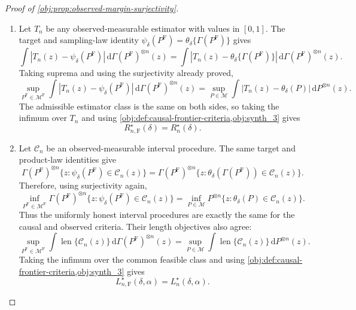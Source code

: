 \begin{proof}[Proof of \cref{obj:prop:observed-margin-surjectivity}]
\begin{enumerate}
\item Let \(T_n\) be any observed-measurable estimator with values in \([0,1]\).  The target and sampling-law identity \(\psi_\delta(P^{\mathrm F})=\theta_\delta\{\Gamma(P^{\mathrm F})\}\) gives
\[
\int
\left|T_n(z)-\psi_\delta(P^{\mathrm F})\right|\,\mathrm d\Gamma(P^{\mathrm F})^{\otimes n}(z)
=
\int
\left|T_n(z)-\theta_\delta\{\Gamma(P^{\mathrm F})\}\right|\,\mathrm d\Gamma(P^{\mathrm F})^{\otimes n}(z).
\]
Taking suprema and using the surjectivity already proved,
\[
\sup_{P^{\mathrm F}\in\mathcal M^{\mathrm F}}
\int
\left|T_n(z)-\psi_\delta(P^{\mathrm F})\right|\,\mathrm d\Gamma(P^{\mathrm F})^{\otimes n}(z)
=
\sup_{P\in\mathcal M}
\int
\left|T_n(z)-\theta_\delta(P)\right|\,\mathrm dP^{\otimes n}(z).
\]
The admissible estimator class is the same on both sides, so taking the infimum over \(T_n\) and using \cref{obj:def:causal-frontier-criteria,obj:synth_3} gives
\[
R_{n,\mathrm F}^{\star}(\delta)=R_n^\star(\delta).
\] %

\item Let \(\mathcal C_n\) be an observed-measurable interval procedure.  The same target and product-law identities give
\[
\Gamma(P^{\mathrm F})^{\otimes n}
\{z:\psi_\delta(P^{\mathrm F})\in\mathcal C_n(z)\}
=
\Gamma(P^{\mathrm F})^{\otimes n}
\{z:\theta_\delta(\Gamma(P^{\mathrm F}))\in\mathcal C_n(z)\}.
\]
Therefore, using surjectivity again,
\[
\inf_{P^{\mathrm F}\in\mathcal M^{\mathrm F}}
\Gamma(P^{\mathrm F})^{\otimes n}
\{z:\psi_\delta(P^{\mathrm F})\in\mathcal C_n(z)\}
=
\inf_{P\in\mathcal M}
P^{\otimes n}\{z:\theta_\delta(P)\in\mathcal C_n(z)\}.
\]
Thus the uniformly honest interval procedures are exactly the same for the causal and observed criteria.  Their length objectives also agree:
\[
\sup_{P^{\mathrm F}\in\mathcal M^{\mathrm F}}
\int \operatorname{len}\{\mathcal C_n(z)\}\,\mathrm d\Gamma(P^{\mathrm F})^{\otimes n}(z)
=
\sup_{P\in\mathcal M}
\int \operatorname{len}\{\mathcal C_n(z)\}\,\mathrm dP^{\otimes n}(z).
\]
Taking the infimum over the common feasible class and using \cref{obj:def:causal-frontier-criteria,obj:synth_3} gives
\[
L_{n,\mathrm F}^{\star}(\delta,\alpha)=L_n^\star(\delta,\alpha).
\] %
\end{enumerate}
\end{proof}

